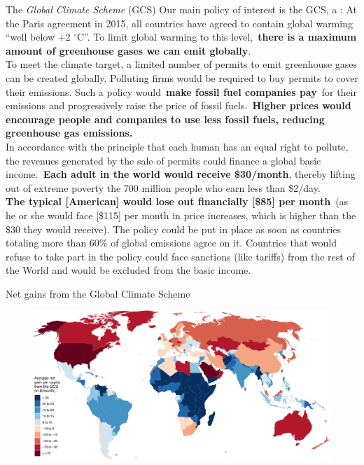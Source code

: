 \begin{framefont}{\small}
\begin{frame}{The \textit{Global Climate Scheme} (GCS)\label{GCS_def}}
\bbvs \ip Our main policy of interest is the GCS, a :
\bbvs \ip \small{ At the Paris agreement in 2015, all countries have agreed to contain global warming ``well below +2 $\mathrm{{}^\circ}$C''. To limit global warming to this level,~\textbf{there is a maximum amount of greenhouse gases we can emit globally}.\\
To meet the climate target, a limited number of permits to emit greenhouse gases can be created globally. Polluting firms would be required to buy permits to cover their emissions. Such a policy would~\textbf{make fossil fuel companies pay}~for their emissions and progressively raise the price of fossil fuels.~\textbf{Higher prices would encourage people and companies to use less fossil fuels, reducing greenhouse gas emissions.}\\
In accordance with the principle that each human has an equal right to pollute, the revenues generated by the sale of permits could finance a global basic income.~\textbf{Each adult in the world would receive \$30/month}, thereby lifting out of extreme poverty the 700 million people who earn less than \$2/day.\\
\textbf{The typical [American] would lose out financially [\$85] per month}~(as he or she would face [\$115] per month in price increases, which is higher than the \$30 they would receive). The policy could be put in place as soon as countries totaling more than 60\% of global emissions agree on it. Countries that would refuse to take part in the policy could face sanctions (like tariffs) from the rest of the World and would be excluded from the basic income.}
\ee
\ee
\end{frame}

\begin{frame}{Net gains from the Global Climate Scheme\label{GCS_gain}}
    \begin{figure}
        \centering 
        \includegraphics[height=.9\textheight]{../figures/maps/mean_gain_2030.pdf} 
    \end{figure}
\end{frame}


\end{framefont}
